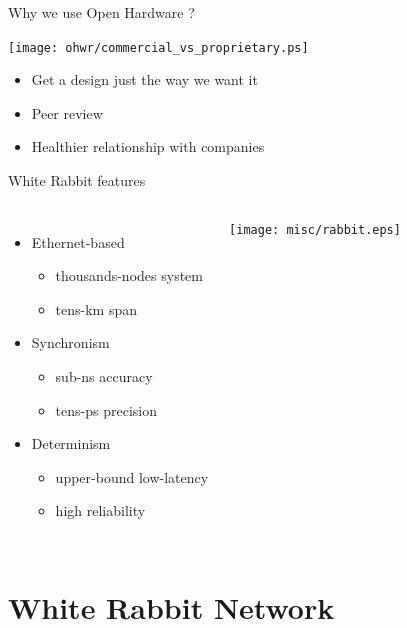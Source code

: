 \documentclass[compress,red]{beamer}
\begin{document}
\begin{frame}{Why we use Open Hardware ?}
  \begin{center}
    \texttt{[image: ohwr/commercial\_vs\_proprietary.ps]}
  \end{center}
  \begin{itemize}
    \item Get a design just the way we want it
    \item Peer review
    \item Healthier relationship with companies
  \end{itemize}
\end{frame}
\begin{frame}{White Rabbit features}

\begin{columns}[c]
	  \begin{itemize}
		  \item Ethernet-based
        \begin{itemize}
		      \item thousands-nodes system
		      \item tens-km span
        \end{itemize}
      \item Synchronism
        \begin{itemize}
		      \item sub-ns accuracy
		      \item tens-ps precision
        \end{itemize}
      \item Determinism
        \begin{itemize}
		      \item upper-bound low-latency
		      \item high reliability
        \end{itemize}
	  \end{itemize}
		\begin{center}
		\texttt{[image: misc/rabbit.eps]}
		\end{center}
	\end{columns}

\end{frame}

\section[WR Network]{White Rabbit Network}
\end{document}
